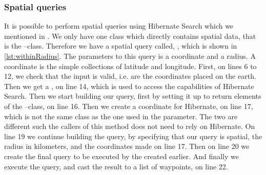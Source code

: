 \subsubsection*{Spatial queries}
It is possible to perform spatial queries using Hibernate Search which we mentioned in .
We only have one class which directly contains spatial data, that is the --class.
Therefore we have a spatial query called, , which is shown in \cref{lst:withinRadius}.
The parameters to this query is a coordinate and a radius.
A coordinate is the simple collections of latitude and longitude.
First, on lines 6 to 12, we check that the input is valid, i.e. are the coordinates placed on the earth.
Then we get a , on line 14, which is used to access the capabilities of Hibernate Search.
Then we start building our query, first by setting it up to return elements of the --class, on line 16.
Then we create a coordinate for Hibernate, on line 17, which is not the same class as the one used in the parameter.
The two are different such the callers of this method does not need to rely on Hibernate.
On line 19 we continue building the query, by specifying that our query is spatial, the radius in kilometers, and the coordinates made on line 17.
Then on line 20 we create the final query to be executed by the  created earlier.
And finally we execute the query, and cast the result to a list of waypoints, on line 22.
